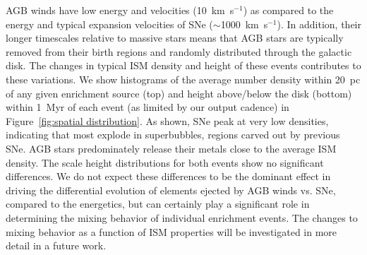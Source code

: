\documentclass[twocolumn]{aastex61}
\begin{document}
AGB winds have low energy and velocities (10~km~s$^{-1}$) as compared to the energy and typical expansion velocities of SNe ($\sim$1000~km~s$^{-1}$). In addition, their longer timescales relative to massive stars means that AGB stars are typically removed from their birth regions and randomly distributed through the galactic disk. The changes in typical ISM density and height of these events contributes to these variations. We show histograms of the average number density within 20~pc of any given enrichment source (top) and height above/below the disk (bottom) within 1~Myr of each event (as limited by our output cadence) in Figure~\ref{fig:spatial distribution}. As shown, SNe peak at very low densities, indicating that most explode in superbubbles, regions carved out by previous SNe. AGB stars predominately release their metals close to the average ISM density. The scale height distributions for both events show no significant differences. We do not expect these differences to be the dominant effect in driving the differential evolution of elements ejected by AGB winds vs. SNe, compared to the energetics, but can certainly play a significant role in determining the mixing behavior of individual enrichment events. The changes to mixing behavior as a function of ISM properties will be investigated in more detail in a future work.
\end{document}
